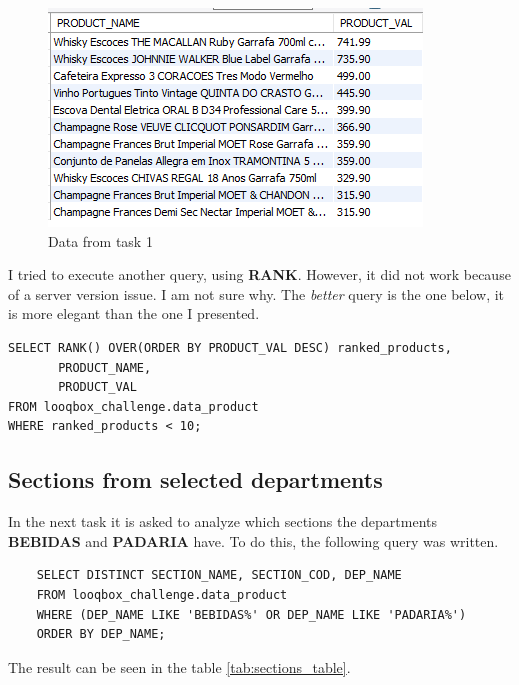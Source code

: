 \documentclass[a4paper, 12pt]{article}
\begin{document}
\begin{figure}[htb]
	\caption{\label{fig_texto_jogo} Data from task 1}
	\begin{center}
		\includegraphics[scale=1.10]{task_1_sql.PNG}
	\end{center}
\end{figure}


\newpage

I tried to execute another query, using \textbf{RANK}. However, it did not work because of a server version issue. I am not sure why. The \textit{better} query is the one below, it is more elegant than the one I presented.

\begin{verbatim}
SELECT RANK() OVER(ORDER BY PRODUCT_VAL DESC) ranked_products,
       PRODUCT_NAME,
       PRODUCT_VAL
FROM looqbox_challenge.data_product
WHERE ranked_products < 10;
\end{verbatim}
\newpage
\subsection{Sections from selected departments}

In the next task it is asked to analyze which sections the departments \textbf{BEBIDAS} and \textbf{PADARIA} have. To do this, the following query was written.

\begin{verbatim}
    SELECT DISTINCT SECTION_NAME, SECTION_COD, DEP_NAME
    FROM looqbox_challenge.data_product
    WHERE (DEP_NAME LIKE 'BEBIDAS%' OR DEP_NAME LIKE 'PADARIA%')
    ORDER BY DEP_NAME;
\end{verbatim}

The result can be seen in the table \ref{tab:sections_table}.
\end{document}

